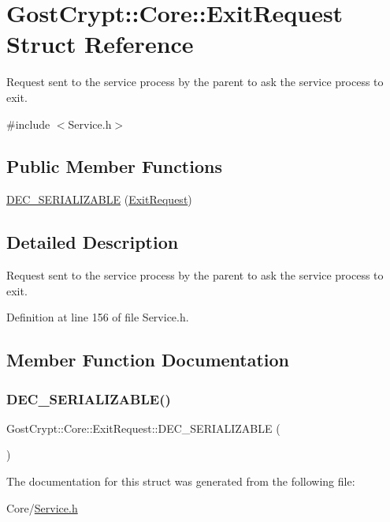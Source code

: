 \hypertarget{struct_gost_crypt_1_1_core_1_1_exit_request}{}\section{Gost\+Crypt\+:\+:Core\+:\+:Exit\+Request Struct Reference}
\label{struct_gost_crypt_1_1_core_1_1_exit_request}


Request sent to the service process by the parent to ask the service process to exit.  




{\ttfamily \#include $<$Service.\+h$>$}

\subsection*{Public Member Functions}
\begin{DoxyCompactItemize}
\item 
\hyperlink{struct_gost_crypt_1_1_core_1_1_exit_request_a19a055adfd31868fe280a221e8c4f422}{D\+E\+C\+\_\+\+S\+E\+R\+I\+A\+L\+I\+Z\+A\+B\+LE} (\hyperlink{struct_gost_crypt_1_1_core_1_1_exit_request}{Exit\+Request})
\end{DoxyCompactItemize}


\subsection{Detailed Description}
Request sent to the service process by the parent to ask the service process to exit. 

Definition at line 156 of file Service.\+h.



\subsection{Member Function Documentation}
\mbox{\label{struct_gost_crypt_1_1_core_1_1_exit_request_a19a055adfd31868fe280a221e8c4f422}} 
\subsubsection{\texorpdfstring{D\+E\+C\+\_\+\+S\+E\+R\+I\+A\+L\+I\+Z\+A\+B\+L\+E()}{DEC\_SERIALIZABLE()}}
{\footnotesize\ttfamily Gost\+Crypt\+::\+Core\+::\+Exit\+Request\+::\+D\+E\+C\+\_\+\+S\+E\+R\+I\+A\+L\+I\+Z\+A\+B\+LE (\begin{DoxyParamCaption}\item[{\hyperlink{struct_gost_crypt_1_1_core_1_1_exit_request}{Exit\+Request}}]{ }\end{DoxyParamCaption})}



The documentation for this struct was generated from the following file\+:\begin{DoxyCompactItemize}
\item 
Core/\hyperlink{_service_8h}{Service.\+h}\end{DoxyCompactItemize}
